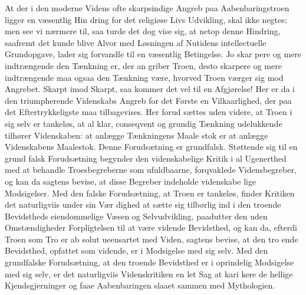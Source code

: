\documentclass[12pt]{book}
\newcommand{\opage}[1]{\marginnote{\footnotesize\textit{[#1]}}}
\begin{document}
At der i den moderne Videns ofte skarpsindige
Angreb paa Aabenbaringstroen ligger en væsentlig Hin\-%
dring for det religiøse Livs Udvikling, skal ikke negtes;
men see vi nærmere til, saa turde det dog vise sig,
at netop denne Hindring, saafremt det kunde blive Alvor
med Løsningen af Nutidens intellectuelle Grundopgave,
lader sig forvandle til en væsentlig Betingelse. Jo skar\-%
pere og mere indtrængende den Tænkning er, der an\-%
griber Troen, desto skarpere og mere indtrængende maa
ogsaa den Tænkning være, hvorved Troen værger sig
mod Angrebet. Skarpt imod Skarpt, saa kommer det
vel til en Afgjørelse! Her er da i den triumpherende
Videnskabs Angreb for det Første en Vilkaarlighed, der
paa det Eftertrykkeligste maa tilbagevises. Her forud\-%
sættes uden videre, at Troen i sig selv er tankeløs, at
al klar, conseqvent og grundig Tænkning udelukkende
tilhører Videnskaben: at anlægge Tænkningens Maale\-%
stok er at anlægge Videnskabens Maalestok. Denne
Forudsætning er grundfalsk. Støttende sig til en grund\-%
falsk Forudsætning begynder den videnskabelige Kritik i
al Ugenerthed med at behandle Troesbegreberne som
\opage{101}\setcounter{footnote}{0}%
ufuldbaarne, forqvaklede Vidensbegreber, og kan da
sagtens bevise, at disse Begreber indeholde videnskabe\-%
lige Modsigelser. Med den falske Forudsætning, at Troen
er tankeløs, finder Kritiken det naturligviis under sin Vær\-%
dighed at sætte sig tilbørlig ind i den troende Bevidstheds
eiendommelige Væsen og Selvudvikling, paadutter den
uden Omstændigheder Forpligtelsen til at være vidende
Bevidsthed, og kan da, efterdi Troen som Tro er ab\-%
solut ueensartet med Viden, sagtens bevise, at den tro\-%
ende Bevidsthed, opfattet som vidende, er i Modsigelse
med sig selv. Med den grundfalske Forudsætning, at den
troende Bevidsthed er i oprindelig Modsigelse med sig
selv, er det naturligviis Videnskritiken en let Sag at kari\-%
kere de hellige Kjendsgjerninger og faae Aabenbaringen
slaaet sammen med Mythologien.
\end{document}
